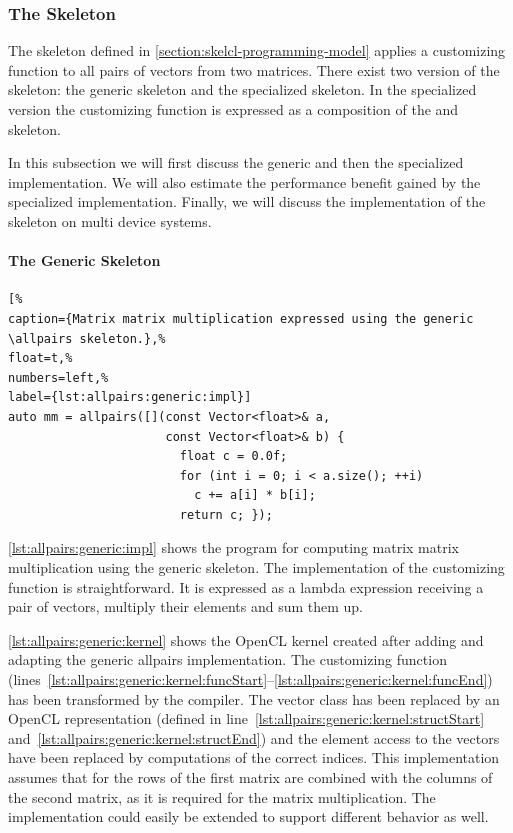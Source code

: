 \subsubsection{The \allpairs Skeleton}
The \allpairs skeleton defined in \autoref{section:skelcl-programming-model} applies a customizing function to all pairs of vectors from two matrices.
There exist two version of the skeleton: the generic \allpairs skeleton and the specialized \allpairs skeleton.
In the specialized version the customizing function is expressed as a composition of the \zip and \reduce skeleton.

In this subsection we will first discuss the generic and then the specialized implementation.
We will also estimate the performance benefit gained by the specialized implementation.
Finally, we will discuss the implementation of the \allpairs skeleton on multi device systems.

\paragraph{The Generic \allpairs Skeleton}
\begin{lstlisting}[%                                                             
caption={Matrix matrix multiplication expressed using the generic \allpairs skeleton.},%
float=t,%                                                                       
numbers=left,%
label={lst:allpairs:generic:impl}]
auto mm = allpairs([](const Vector<float>& a,
                      const Vector<float>& b) {
                        float c = 0.0f;
                        for (int i = 0; i < a.size(); ++i)
                          c += a[i] * b[i];
                        return c; });
\end{lstlisting}

\autoref{lst:allpairs:generic:impl} shows the \SkelCL program for computing matrix matrix multiplication using the generic \allpairs skeleton.
The implementation of the customizing function is straightforward.
It is expressed as a lambda expression receiving a pair of vectors, multiply their elements and sum them up.

\autoref{lst:allpairs:generic:kernel} shows the OpenCL kernel created after adding and adapting the generic allpairs implementation.
The customizing function (lines~\ref{lst:allpairs:generic:kernel:funcStart}--\ref{lst:allpairs:generic:kernel:funcEnd}) has been transformed by the  compiler.
The vector class has been replaced by an OpenCL representation (defined in line~\ref{lst:allpairs:generic:kernel:structStart} and~\ref{lst:allpairs:generic:kernel:structEnd}) and the element access to the vectors have been replaced by computations of the correct indices.
This implementation assumes that for the rows of the first matrix are combined with the columns of the second matrix, as it is required for the matrix multiplication.
The implementation could easily be extended to support different behavior as well.

